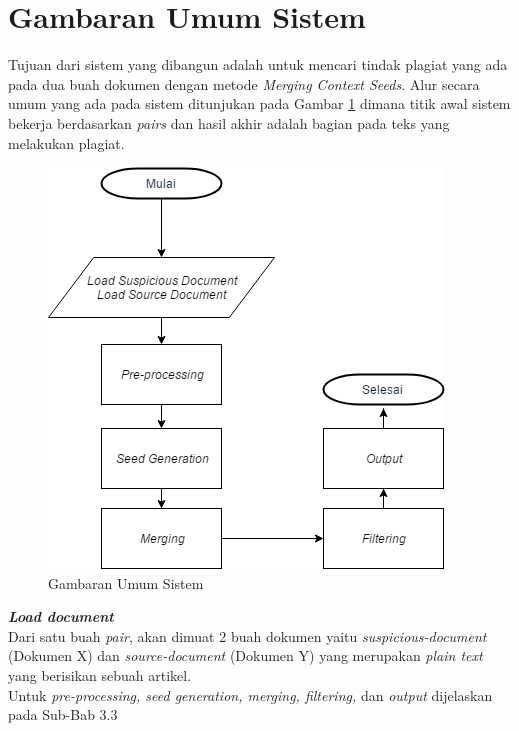 \documentclass[../Book.tex]{subfiles}
\begin{document}
	\section{Gambaran Umum Sistem}
	Tujuan dari sistem yang dibangun adalah untuk mencari tindak plagiat yang ada pada dua buah dokumen dengan metode \textit{Merging Context Seeds}. Alur secara umum yang ada pada sistem ditunjukan pada Gambar \ref{fig:gambarumumsistem} dimana titik awal sistem bekerja berdasarkan \textit{pairs} dan hasil akhir adalah bagian pada teks yang melakukan plagiat.
	
	\begin{center}
		\begin{figure}[H]
			\includegraphics[width=.7\linewidth]{../images/flowchart}
			\caption{Gambaran Umum Sistem}
			\label{fig:gambarumumsistem}
		\end{figure}
	\end{center} 
	
	\noindent \textbf{\textit{Load document}} \\
	Dari satu buah \textit{pair}, akan dimuat 2 buah dokumen yaitu \textit{suspicious-document} (Dokumen X) dan \textit{source-document} (Dokumen Y) yang merupakan \textit{plain text} yang berisikan sebuah artikel. \\
	
	\noindent Untuk \textit{pre-processing, seed generation, merging, filtering, }dan \textit{output} dijelaskan pada Sub-Bab 3.3
	
\end{document}
